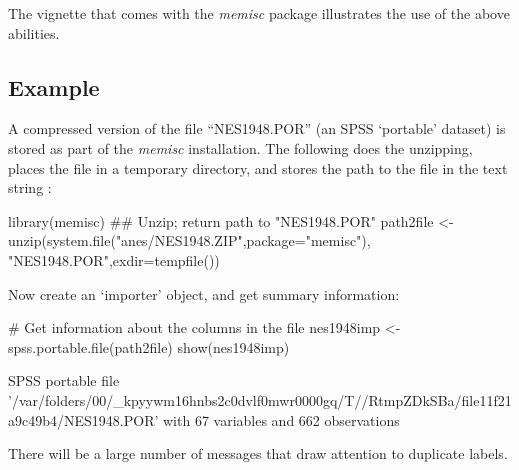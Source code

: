 The vignette  that comes with the {\em memisc} package
illustrates the use of the above abilities.

\subsection*{Example}

A compressed version of the file ``NES1948.POR'' (an SPSS `portable' dataset)
is stored as part of the {\em memisc} installation.  The following
does the unzipping, places the file in a temporary directory,
and stores the path to the file in the text string :
\begin{fullwidth}

\begin{Schunk}
\begin{Sinput}
library(memisc)
## Unzip; return path to "NES1948.POR"
path2file <- unzip(system.file("anes/NES1948.ZIP",package="memisc"),
                     "NES1948.POR",exdir=tempfile())
\end{Sinput}
\end{Schunk}

\end{fullwidth}

Now create an `importer' object, and get summary information:
\begin{fullwidth}
\begin{Schunk}
\begin{Sinput}
# Get information about the columns in the file
nes1948imp <- spss.portable.file(path2file)
show(nes1948imp)
\end{Sinput}
\end{Schunk}
\footnotesize
\begin{Schunk}
\begin{Soutput}

SPSS portable file '/var/folders/00/_kpyywm16hnbs2c0dvlf0mwr0000gq/T//RtmpZDkSBa/file11f21a9c49b4/NES1948.POR' 
	with 67 variables and 662 observations
\end{Soutput}
\end{Schunk}
\end{fullwidth}
There will be a large number of messages that draw attention to
duplicate labels.

